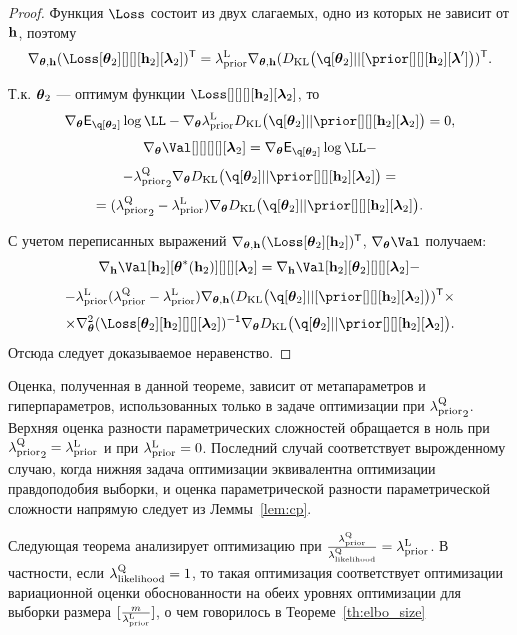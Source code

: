 \begin{proof}
Функция $\Loss$ состоит из двух слагаемых, одно из которых не зависит от $\mathbf{h}$, поэтому
\[
    \nabla_{\teta, \h} (\Loss[\teta_2][][][\h_2][\lam_2])^\mathsf{T}  = \lamCL \nabla_{\teta, \h} (\KL{\q[\teta_2]}{[\prior[][][\h_2][\lam']})^\mathsf{T}.
\]

Т.к. $\boldsymbol{\theta}_2$ --- оптимум функции $\Loss[][][][\h_2][\lam_2]$, то 
$$ 
\nabla_{\teta} \E_{\q[\teta_2]} \log \LL - \nabla_{\teta} \lamCL \KL{\q[\teta_2]}{\prior[][][\h_2][\lam_2]} = 0,
$$
$$ 
\nabla_{\teta} \Val[][][][][\lam_2] =\nabla_{\teta} \E_{\q[\teta_2]} \log \LL -
$$
\[
- {\lamCQ}_2  \nabla_{\teta} \KL{\q[\teta_2]}{\prior[][][\h_2][\lam_2]} = 
\]
$$
   = ({\lamCQ}_2 - \lamCL)\nabla_{\teta} \KL{\q[\teta_2]}{\prior[][][\h_2][\lam_2]}.
$$

С учетом переписанных выражений $\nabla_{\teta, \h} (\Loss[\teta_2][\h_2])^\mathsf{T}$, $\nabla_{\teta} \Val$ получаем:
\[
     \nabla_{\h} \Val[\h_2][\teta^{*}(\h_2)][][][\lam_2]  = \nabla_{\h} \Val[\h_2][\teta_2][][][\lam_2] -
\]
\[
    -  \lamCL (\lamCQ - \lamCL)\nabla_{\teta, \h} (\KL{\q[\teta_2]}{[\prior[][][\h_2][\lam_2]})^\mathsf{T}  \times 
\]
\[
\times  \nabla_{\teta}^2(\Loss[\teta_2][\h_2][][][\lam_2])^\mathsf{-1} \nabla_{\teta} \KL{\q[\teta_2]}{\prior[][][\h_2][\lam_2]}.
\]
Отсюда следует доказываемое неравенство.
\end{proof}
Оценка, полученная в данной теореме, зависит от метапараметров и гиперпараметров, использованных только в задаче оптимизации при ${\lambda_\text{prior}^\text{Q}}_2$. Верхняя оценка разности параметрических сложностей обращается в ноль при ${\lambda_\text{prior}^\text{Q}}_2 = \lambda_\text{prior}^\text{L}$ и при $\lambda_\text{prior}^\text{L} = 0$. Последний случай соответствует вырожденному случаю, когда нижняя задача оптимизации эквивалентна оптимизации правдоподобия выборки, и оценка параметрической разности параметрической сложности напрямую следует из Леммы~\ref{lem:cp}.

Следующая теорема анализирует оптимизацию при  $\frac{\lambda_\text{prior}^\text{Q}}{\lambda_\text{likelihood}^\text{Q}} = \lambda_\text{prior}^\text{L}$. В частности, если $\lambda_\text{likelihood}^\text{Q} = 1$, то такая оптимизация соответствует оптимизации вариационной оценки обоснованности на обеих уровнях оптимизации для выборки размера $[\frac{m}{\lambda_\text{prior}^\text{L}}]$, о чем говорилось в Теореме~\ref{th:elbo_size}

